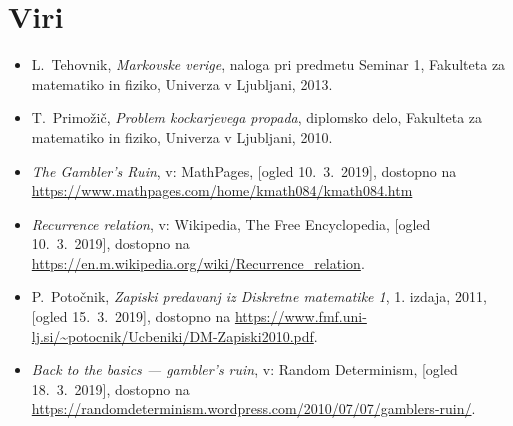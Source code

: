 \documentclass[12pt, a4paper]{article}
\begin{document}
\section[Viri]{Viri}
\begin{itemize}
\item L.~Tehovnik, \emph{Markovske verige}, naloga pri predmetu Seminar 1, Fakulteta za matematiko in fiziko, Univerza v Ljubljani, 2013.
\item T.~Primožič, \emph{Problem kockarjevega propada}, diplomsko delo, Fakulteta za matematiko in fiziko, Univerza v Ljubljani, 2010.
\item \emph{The Gambler's Ruin}, v: MathPages, [ogled 10.~3.~2019], dostopno na \url{https://www.mathpages.com/home/kmath084/kmath084.htm}
\item \emph{Recurrence relation}, v: Wikipedia, The Free Encyclopedia, [ogled 10.~3.~2019], dostopno na \url{https://en.m.wikipedia.org/wiki/Recurrence_relation}.
\item P.~Potočnik, \emph{Zapiski predavanj iz Diskretne matematike 1}, 1. izdaja, 2011, [ogled 15.~3.~2019], dostopno na \url{https://www.fmf.uni-lj.si/~potocnik/Ucbeniki/DM-Zapiski2010.pdf}.
\item \emph{Back to the basics — gambler’s ruin}, v: Random Determinism, [ogled 18.~3.~2019], dostopno na \url{https://randomdeterminism.wordpress.com/2010/07/07/gamblers-ruin/}.
\end{itemize}
\end{document}

